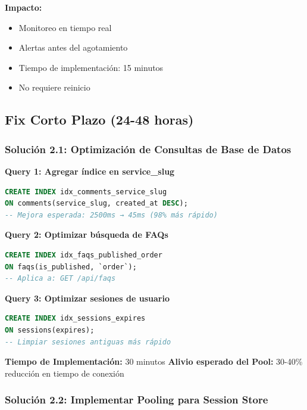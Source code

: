 \documentclass[12pt,a4paper]{article}
\begin{document}
\textbf{Impacto:}
\begin{itemize}
    \item Monitoreo en tiempo real
    \item Alertas antes del agotamiento
    \item Tiempo de implementación: 15 minutos
    \item No requiere reinicio
\end{itemize}

\subsection{Fix Corto Plazo (24-48 horas)}

\subsubsection{Solución 2.1: Optimización de Consultas de Base de Datos}

\textbf{Query 1: Agregar índice en service\_slug}

\begin{lstlisting}[language=sql, caption=Crear índice para comments]
CREATE INDEX idx_comments_service_slug 
ON comments(service_slug, created_at DESC);
-- Mejora esperada: 2500ms → 45ms (98% más rápido)
\end{lstlisting}

\textbf{Query 2: Optimizar búsqueda de FAQs}

\begin{lstlisting}[language=sql, caption=Crear índice para faqs]
CREATE INDEX idx_faqs_published_order 
ON faqs(is_published, `order`);
-- Aplica a: GET /api/faqs
\end{lstlisting}

\textbf{Query 3: Optimizar sesiones de usuario}

\begin{lstlisting}[language=sql, caption=Crear índice para sessions]
CREATE INDEX idx_sessions_expires 
ON sessions(expires);
-- Limpiar sesiones antiguas más rápido
\end{lstlisting}

\textbf{Tiempo de Implementación:} 30 minutos  
\textbf{Alivio esperado del Pool:} 30-40\% reducción en tiempo de conexión

\subsubsection{Solución 2.2: Implementar Pooling para Session Store}
\end{document}
